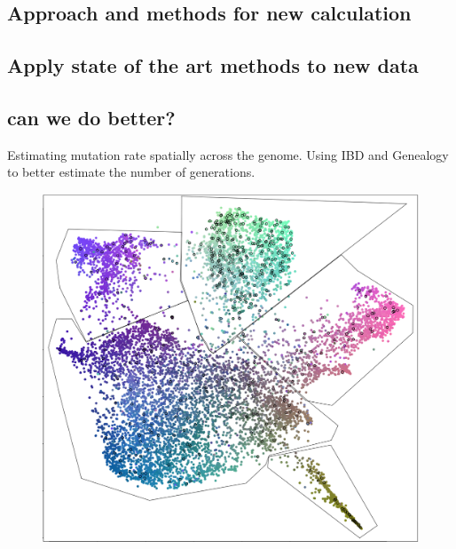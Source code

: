 \documentclass[
11pt, %
oneside, %
english, %
doublespacing, %
headsepline, %
]{MastersDoctoralThesis} %
\begin{document}
\subsection{Approach and methods for new calculation}

\subsection{Apply state of the art methods to new data}

\subsection{can we do better?}
Estimating mutation rate spatially across the genome.
Using IBD and Genealogy to better estimate the number of generations.


\appendix %

\begin{figure}
\includegraphics[width=\hsize,keepaspectratio]{./Figures/5Clusters.png}
\label{Cluster}
\end{figure}


%



\printbibliography[heading=bibintoc]

\end{document}
